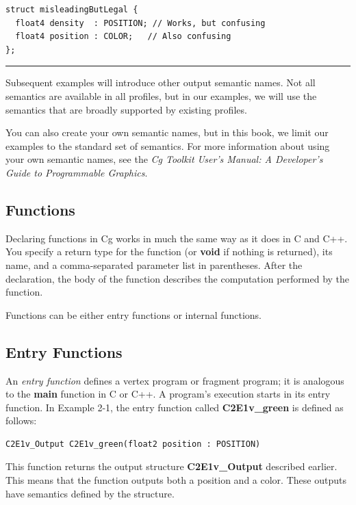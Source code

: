 \documentclass{book}
\begin{document}
\FloatBarrier
\begin{lstlisting}
struct misleadingButLegal {
  float4 density  : POSITION; // Works, but confusing
  float4 position : COLOR;   // Also confusing
};
\end{lstlisting}
\FloatBarrier
\hrule

Subsequent examples will introduce other output semantic names. Not all semantics are available in all profiles, but in our examples, we will use the semantics that are broadly supported by existing profiles.

You can also create your own semantic names, but in this book, we limit our examples to the standard set of semantics. For more information about using your own semantic names, see the \textit{Cg Toolkit User's Manual: A Developer's Guide to Programmable Graphics}.

\subsection{Functions}

Declaring functions in Cg works in much the same way as it does in C and C++. You specify a return type for the function (or \textbf{void} if nothing is returned), its name, and a comma-separated parameter list in parentheses. After the declaration, the body of the function describes the computation performed by the function.

Functions can be either entry functions or internal functions.

\subsection*{Entry Functions}

An \textit{entry function} defines a vertex program or fragment program; it is analogous to the \textbf{main} function in C or C++. A program's execution starts in its entry function. In Example 2-1, the entry function called \textbf{C2E1v_green} is defined as follows:

\FloatBarrier
\begin{lstlisting}
C2E1v_Output C2E1v_green(float2 position : POSITION)
\end{lstlisting}
\FloatBarrier

This function returns the output structure \textbf{C2E1v_Output} described earlier. This means that the function outputs both a position and a color. These outputs have semantics defined by the structure.
\end{document}
